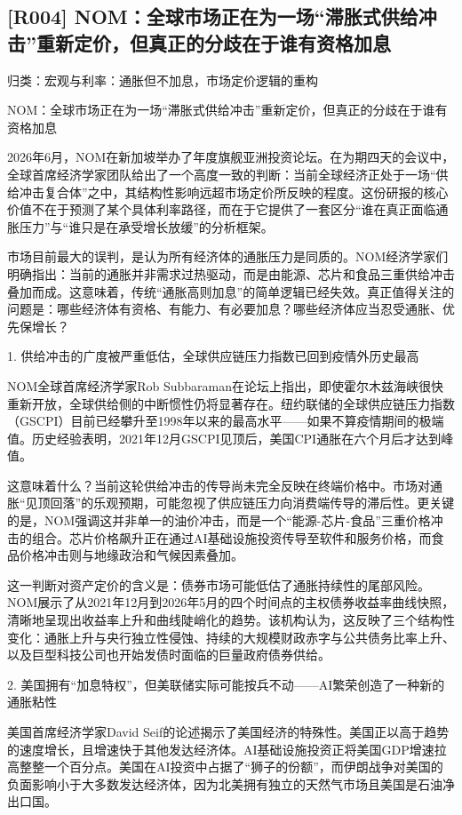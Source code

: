 \documentclass[11pt]{ctexart}
\begin{document}
\subsection{[R004] NOM：全球市场正在为一场“滞胀式供给冲击”重新定价，但真正的分歧在于谁有资格加息}
{\small\color{refgray}归类：宏观与利率：通胀但不加息，市场定价逻辑的重构}

NOM：全球市场正在为一场“滞胀式供给冲击”重新定价，但真正的分歧在于谁有资格加息

2026年6月，NOM在新加坡举办了年度旗舰亚洲投资论坛。在为期四天的会议中，全球首席经济学家团队给出了一个高度一致的判断：当前全球经济正处于一场“供给冲击复合体”之中，其结构性影响远超市场定价所反映的程度。这份研报的核心价值不在于预测了某个具体利率路径，而在于它提供了一套区分“谁在真正面临通胀压力”与“谁只是在承受增长放缓”的分析框架。

市场目前最大的误判，是认为所有经济体的通胀压力是同质的。NOM经济学家们明确指出：当前的通胀并非需求过热驱动，而是由能源、芯片和食品三重供给冲击叠加而成。这意味着，传统“通胀高则加息”的简单逻辑已经失效。真正值得关注的问题是：哪些经济体有资格、有能力、有必要加息？哪些经济体应当忍受通胀、优先保增长？

1. 供给冲击的广度被严重低估，全球供应链压力指数已回到疫情外历史最高

NOM全球首席经济学家Rob Subbaraman在论坛上指出，即使霍尔木兹海峡很快重新开放，全球供给侧的中断惯性仍将显著存在。纽约联储的全球供应链压力指数（GSCPI）目前已经攀升至1998年以来的最高水平——如果不算疫情期间的极端值。历史经验表明，2021年12月GSCPI见顶后，美国CPI通胀在六个月后才达到峰值。

这意味着什么？当前这轮供给冲击的传导尚未完全反映在终端价格中。市场对通胀“见顶回落”的乐观预期，可能忽视了供应链压力向消费端传导的滞后性。更关键的是，NOM强调这并非单一的油价冲击，而是一个“能源-芯片-食品”三重价格冲击的组合。芯片价格飙升正在通过AI基础设施投资传导至软件和服务价格，而食品价格冲击则与地缘政治和气候因素叠加。

这一判断对资产定价的含义是：债券市场可能低估了通胀持续性的尾部风险。NOM展示了从2021年12月到2026年5月的四个时间点的主权债券收益率曲线快照，清晰地呈现出收益率上升和曲线陡峭化的趋势。该机构认为，这反映了三个结构性变化：通胀上升与央行独立性侵蚀、持续的大规模财政赤字与公共债务比率上升、以及巨型科技公司也开始发债时面临的巨量政府债券供给。

2. 美国拥有“加息特权”，但美联储实际可能按兵不动——AI繁荣创造了一种新的通胀粘性

美国首席经济学家David Seif的论述揭示了美国经济的特殊性。美国正以高于趋势的速度增长，且增速快于其他发达经济体。AI基础设施投资正将美国GDP增速拉高整整一个百分点。美国在AI投资中占据了“狮子的份额”，而伊朗战争对美国的负面影响小于大多数发达经济体，因为北美拥有独立的天然气市场且美国是石油净出口国。
\end{document}

